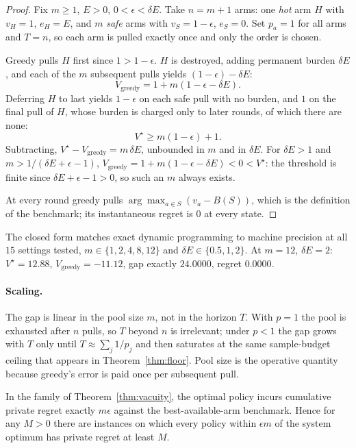 \begin{proof}
Fix $m \ge 1$, $E > 0$, $0 < \epsilon < \delta E$. Take $n = m{+}1$ arms: one
\emph{hot} arm $H$ with $v_H = 1$, $e_H = E$, and $m$ \emph{safe} arms with
$v_S = 1-\epsilon$, $e_S = 0$. Set $p_a = 1$ for all arms and $T = n$, so each arm
is pulled exactly once and only the order is chosen.

Greedy pulls $H$ first since $1 > 1-\epsilon$. $H$ is destroyed, adding permanent
burden $\delta E$, and each of the $m$ subsequent pulls yields
$(1-\epsilon) - \delta E$:
\[
V_{\mathrm{greedy}} = 1 + m(1 - \epsilon - \delta E).
\]
Deferring $H$ to last yields $1-\epsilon$ on each safe pull with no burden, and $1$
on the final pull of $H$, whose burden is charged only to later rounds, of which
there are none:
\[
V^\star \ge m(1-\epsilon) + 1 .
\]
Subtracting, $V^\star - V_{\mathrm{greedy}} = m\,\delta E$, unbounded in $m$ and in
$\delta E$. For $\delta E>1$ and $m > 1/(\delta E+\epsilon-1)$,
$V_{\mathrm{greedy}} = 1+m(1-\epsilon-\delta E) < 0 < V^\star$: the threshold is
finite since $\delta E+\epsilon-1>0$, so such an $m$ always exists.

At every round greedy pulls $\arg\max_{a\in S} (v_a - B(S))$, which is the
definition of the benchmark; its instantaneous regret is $0$ at every state.
\end{proof}

The closed form matches exact dynamic programming to machine precision at all $15$
settings tested, $m \in \{1,2,4,8,12\}$ and $\delta E \in \{0.5,1,2\}$. At $m=12$,
$\delta E = 2$: $V^\star = 12.88$, $V_{\mathrm{greedy}} = -11.12$, gap exactly
$24.0000$, regret $0.0000$.

\paragraph{Scaling.} The gap is linear in the pool size $m$, not in the horizon
$T$. With $p=1$ the pool is exhausted after $n$ pulls, so $T$ beyond $n$ is
irrelevant; under $p<1$ the gap grows with $T$ only until $T \approx \sum_j 1/p_j$
and then saturates at the same sample-budget ceiling that appears in
Theorem~\ref{thm:floor}. Pool size is the operative quantity because greedy's error
is paid once per subsequent pull.

\begin{theorem}
\label{thm:converse}
In the family of Theorem~\ref{thm:vacuity}, the optimal policy incurs cumulative
private regret exactly $m\epsilon$ against the best-available-arm benchmark. Hence
for any $M>0$ there are instances on which every policy within $\epsilon m$ of the
system optimum has private regret at least $M$.
\end{theorem}

